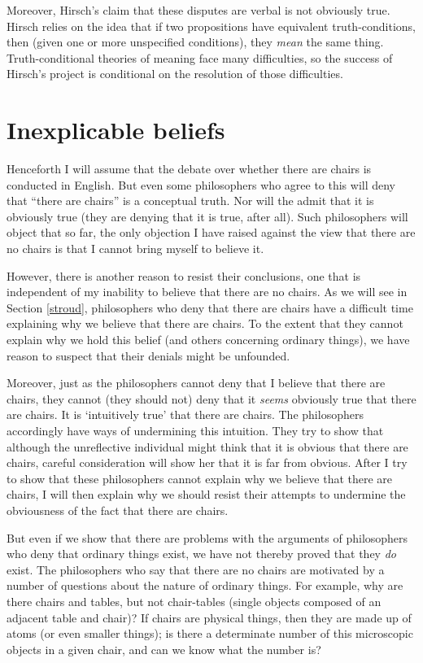 \documentclass[11pt]{article}
\begin{document}
\begin{spacing}{1.25}
Moreover, Hirsch's claim that these disputes are verbal is not
obviously true.  Hirsch relies on the idea that if two propositions
have equivalent truth-conditions, then (given one or more unspecified
conditions), they {\em mean} the same thing.  Truth-conditional
theories of meaning face many difficulties, so the success of Hirsch's
project is conditional on the resolution of those difficulties.

\section{Inexplicable beliefs}
Henceforth I will assume that the debate over whether there are chairs
is conducted in English.  But even some philosophers who agree to this
will deny that ``there are chairs'' is a conceptual truth.  Nor will
the admit that it is obviously true (they are denying that it is true,
after all).  Such philosophers will object that so far, the only
objection I have raised against the view that there are no chairs is
that I cannot bring myself to believe it.

However, there is another reason to resist their conclusions, one that
is independent of my inability to believe that there are no chairs.
As we will see in Section \ref{stroud}, philosophers who deny that
there are chairs have a difficult time explaining why we believe that
there are chairs.  To the extent that they cannot explain why we hold
this belief (and others concerning ordinary things), we have reason to
suspect that their denials might be unfounded.

Moreover, just as the philosophers cannot deny that I believe that
there are chairs, they cannot (they should not) deny that it {\em
  seems} obviously true that there are chairs.  It is `intuitively
true' that there are chairs.  The philosophers accordingly have ways
of undermining this intuition.  They try to show that although the
unreflective individual might think that it is obvious that there are
chairs, careful consideration will show her that it is far from
obvious.  After I try to show that these philosophers cannot explain
why we believe that there are chairs, I will then explain why we
should resist their attempts to undermine the obviousness of the fact
that there are chairs.

But even if we show that there are problems with the arguments of
philosophers who deny that ordinary things exist, we have not thereby
proved that they {\em do} exist.  The philosophers who say that there
are no chairs are motivated by a number of questions about the nature
of ordinary things.  For example, why are there chairs and tables, but
not chair-tables (single objects composed of an adjacent table and
chair)?  If chairs are physical things, then they are made up of atoms
(or even smaller things); is there a determinate number of this
microscopic objects in a given chair, and can we know what the number
is?


\end{spacing}
\end{document}
